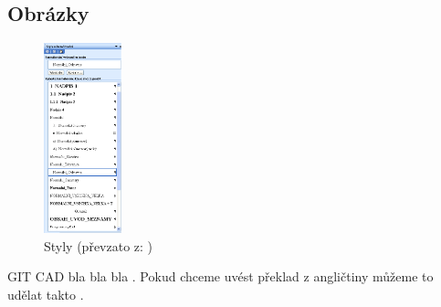  \subsection{Obrázky}

    \begin{figure}[H]
      \centering
      \includegraphics[width=0.2\textwidth]{./obrazky/obrazek_1.png}
      \caption {Styly (převzato z: \cite{Celikyilmaz2009})}
      \label{fig:44}
    \end{figure}

    \Gls{GIT} \Gls{CAD} bla bla bla . Pokud chceme uvést překlad z angličtiny můžeme to udělat takto .

